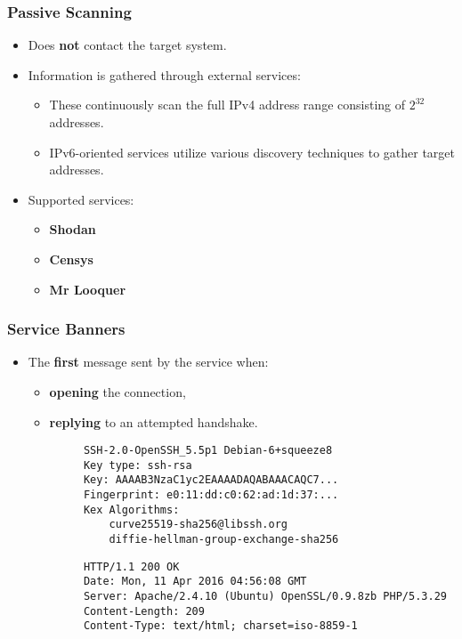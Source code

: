 \documentclass[aspectratio=169,xcolor={usenames,dvipsnames}]{beamer}
\newcommand{\ispace}{\vspace{10pt}}
\begin{document}
\begin{frame}
	\frametitle{Passive Scanning}
	
	\begin{itemize}
		\item Does \textbf{not} contact the target system.
		\item Information is gathered through external services:
		\begin{itemize}
			\item These continuously scan the full IPv4 address range consisting of $2^{32}$ addresses.
			\item IPv6-oriented services utilize various discovery techniques to gather target addresses.
		\end{itemize}
	\end{itemize}
	
	\ispace
	
	\begin{itemize}
		\item Supported services:
		\begin{itemize}
			\item \textbf{Shodan}
			\item \textbf{Censys}
			\item \textbf{Mr Looquer}
		\end{itemize}
	\end{itemize}
\end{frame}

\begin{frame}[fragile]
	\frametitle{Service Banners}
	
	\begin{itemize}
		\item The \textbf{first} message sent by the service when:
		\begin{itemize}
			\item \textbf{opening} the connection,
			\item \textbf{replying} to an attempted handshake.
		\end{itemize}
	\end{itemize}
	
	\vspace{16pt}
	
	\begin{multicols}{2}
		\begin{verbatim}
			SSH-2.0-OpenSSH_5.5p1 Debian-6+squeeze8
			Key type: ssh-rsa
			Key: AAAAB3NzaC1yc2EAAAADAQABAAACAQC7...
			Fingerprint: e0:11:dd:c0:62:ad:1d:37:...
			Kex Algorithms:
				curve25519-sha256@libssh.org
				diffie-hellman-group-exchange-sha256
		\end{verbatim}
		\begin{verbatim}
			HTTP/1.1 200 OK
			Date: Mon, 11 Apr 2016 04:56:08 GMT
			Server: Apache/2.4.10 (Ubuntu) OpenSSL/0.9.8zb PHP/5.3.29
			Content-Length: 209
			Content-Type: text/html; charset=iso-8859-1 
		\end{verbatim}
	\end{multicols}
\end{frame}
\end{document}
